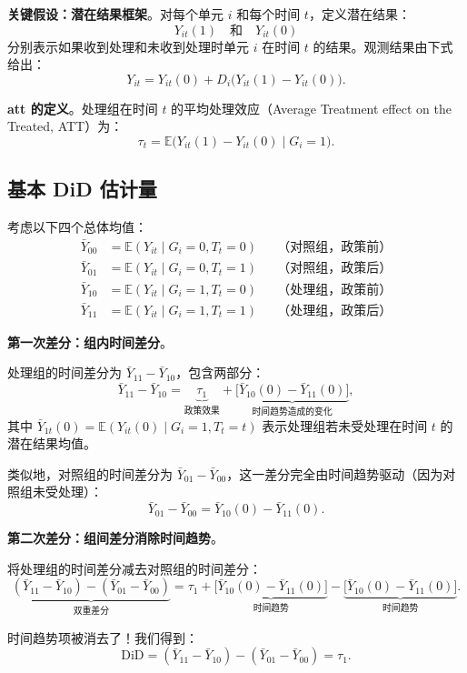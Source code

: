 \textbf{关键假设：潜在结果框架}。对每个单元 $i$ 和每个时间 $t$，定义潜在结果：
\[
Y_{it}(1) \quad \text{和} \quad Y_{it}(0)
\]
分别表示如果收到处理和未收到处理时单元 $i$ 在时间 $t$ 的结果。观测结果由下式给出：
\[
Y_{it} = Y_{it}(0) + D_i \bigl( Y_{it}(1) - Y_{it}(0) \bigr).
\]

\textbf{att 的定义}。处理组在时间 $t$ 的平均处理效应（Average Treatment effect on the Treated, ATT）为：
\[
\tau_t = \mathbb{E}\bigl( Y_{it}(1) - Y_{it}(0) \mid G_i = 1 \bigr).
\]

\subsection{基本 DiD 估计量}\label{sec:appendix-did-estimator}

考虑以下四个总体均值：
\[
\begin{aligned}
\bar{Y}_{00} &= \mathbb{E}(Y_{it} \mid G_i = 0, T_t = 0) &&\text{（对照组，政策前）}\\
\bar{Y}_{01} &= \mathbb{E}(Y_{it} \mid G_i = 0, T_t = 1) &&\text{（对照组，政策后）}\\
\bar{Y}_{10} &= \mathbb{E}(Y_{it} \mid G_i = 1, T_t = 0) &&\text{（处理组，政策前）}\\
\bar{Y}_{11} &= \mathbb{E}(Y_{it} \mid G_i = 1, T_t = 1) &&\text{（处理组，政策后）}
\end{aligned}
\]

\textbf{第一次差分：组内时间差分}。

处理组的时间差分为 $\bar{Y}_{11} - \bar{Y}_{10}$，包含两部分：
\[
\bar{Y}_{11} - \bar{Y}_{10} = \underbrace{\tau_1}_{\text{政策效果}} + \underbrace{\bigl[ \bar{Y}_{10}(0) - \bar{Y}_{11}(0) \bigr]}_{\text{时间趋势造成的变化}} ,
\]
其中 $\bar{Y}_{1t}(0) = \mathbb{E}(Y_{it}(0) \mid G_i = 1, T_t = t)$ 表示处理组若未受处理在时间 $t$ 的潜在结果均值。

类似地，对照组的时间差分为 $\bar{Y}_{01} - \bar{Y}_{00}$，这一差分完全由时间趋势驱动（因为对照组未受处理）：
\[
\bar{Y}_{01} - \bar{Y}_{00} = \bar{Y}_{10}(0) - \bar{Y}_{11}(0).
\]

\textbf{第二次差分：组间差分消除时间趋势}。

将处理组的时间差分减去对照组的时间差分：
\[
\underbrace{(\bar{Y}_{11} - \bar{Y}_{10}) - (\bar{Y}_{01} - \bar{Y}_{00})}_{\text{双重差分}}
= \tau_1 + \underbrace{\bigl[ \bar{Y}_{10}(0) - \bar{Y}_{11}(0) \bigr]}_{\text{时间趋势}} - \underbrace{\bigl[ \bar{Y}_{10}(0) - \bar{Y}_{11}(0) \bigr]}_{\text{时间趋势}}.
\]

时间趋势项被消去了！我们得到：
\[
\text{DiD} = (\bar{Y}_{11} - \bar{Y}_{10}) - (\bar{Y}_{01} - \bar{Y}_{00}) = \tau_1.
\]

